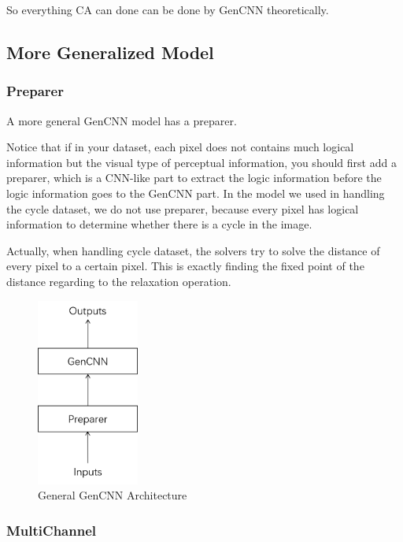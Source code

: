 \documentclass{article}
\begin{document}
So everything CA can done can be done by GenCNN theoretically.

\subsection{More Generalized Model}

\subsubsection{Preparer}

A more general GenCNN model has a preparer. 

Notice that if in your dataset, each pixel does not contains much logical information but the visual type of perceptual information,
you should first add a preparer, which is a CNN-like part to extract the logic information before the logic information goes to the GenCNN part. 
In the model we used in handling the cycle dataset, we do not use preparer, 
because every pixel has logical information to determine whether there is a cycle in the image.

Actually, when handling cycle dataset, the solvers try to solve the distance of every pixel to a certain pixel. 
This is exactly finding the fixed point of the distance regarding to the relaxation operation.

\begin{figure}[H] %
    \centering %
    \includegraphics[width=0.3\textwidth]{../image/gen.png} %
    \caption{General GenCNN Architecture} %
    \label{Fig.GenCNN} %
\end{figure}


\subsubsection{MultiChannel}
\end{document}
